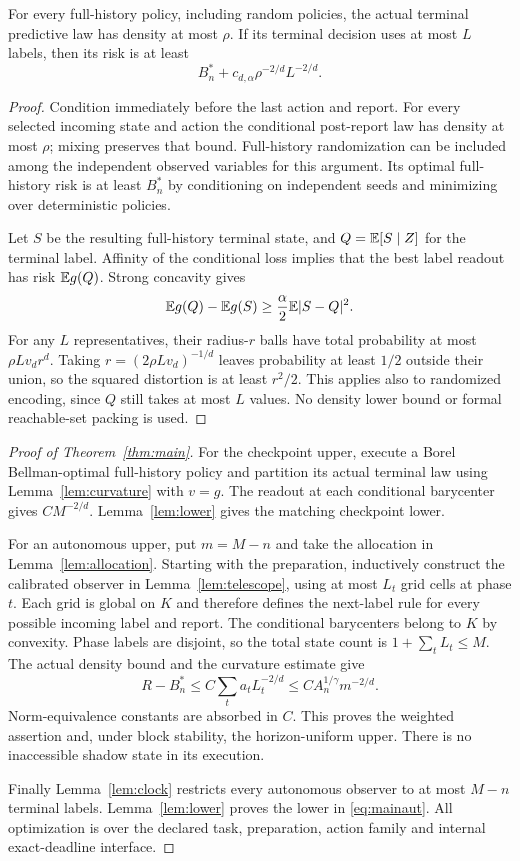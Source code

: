 \begin{lemma}\label{lem:lower}
For every full-history policy, including random policies, the actual terminal predictive law has density at most $\rho$. If its terminal decision uses at most $L$ labels, then its risk is at least
\[
 B_n^*+c_{d,\alpha}\rho^{-2/d}L^{-2/d}.
\]
\end{lemma}
\begin{proof}
Condition immediately before the last action and report. For every selected incoming state and action the conditional post-report law has density at most $\rho$; mixing preserves that bound. Full-history randomization can be included among the independent observed variables for this argument. Its optimal full-history risk is at least $B_n^*$ by conditioning on independent seeds and minimizing over deterministic policies.

Let $S$ be the resulting full-history terminal state, and $Q=\mathbb E[S\mid Z]$ for the terminal label. Affinity of the conditional loss implies that the best label readout has risk $\mathbb E g(Q)$. Strong concavity gives
\[
 \mathbb E g(Q)-\mathbb E g(S)\ge\frac{\alpha}{2}\mathbb E|S-Q|^2.
\]
For any $L$ representatives, their radius-$r$ balls have total probability at most $\rho L v_dr^d$. Taking $r=(2\rho L v_d)^{-1/d}$ leaves probability at least $1/2$ outside their union, so the squared distortion is at least $r^2/2$. This applies also to randomized encoding, since $Q$ still takes at most $L$ values. No density lower bound or formal reachable-set packing is used.
\end{proof}

\begin{proof}[Proof of Theorem~\ref{thm:main}]
For the checkpoint upper, execute a Borel Bellman-optimal full-history policy and partition its actual terminal law using Lemma~\ref{lem:curvature} with $v=g$. The readout at each conditional barycenter gives $CM^{-2/d}$. Lemma~\ref{lem:lower} gives the matching checkpoint lower.

For an autonomous upper, put $m=M-n$ and take the allocation in Lemma~\ref{lem:allocation}. Starting with the preparation, inductively construct the calibrated observer in Lemma~\ref{lem:telescope}, using at most $L_t$ grid cells at phase $t$. Each grid is global on $K$ and therefore defines the next-label rule for every possible incoming label and report. The conditional barycenters belong to $K$ by convexity. Phase labels are disjoint, so the total state count is $1+\sum_tL_t\le M$. The actual density bound and the curvature estimate give
\[
 R-B_n^*\le C\sum_t a_tL_t^{-2/d}
 \le C A_n^{1/\gamma}m^{-2/d}.
\]
Norm-equivalence constants are absorbed in $C$. This proves the weighted assertion and, under block stability, the horizon-uniform upper. There is no inaccessible shadow state in its execution.

Finally Lemma~\ref{lem:clock} restricts every autonomous observer to at most $M-n$ terminal labels. Lemma~\ref{lem:lower} proves the lower in \eqref{eq:mainaut}. All optimization is over the declared task, preparation, action family and internal exact-deadline interface.
\end{proof}


